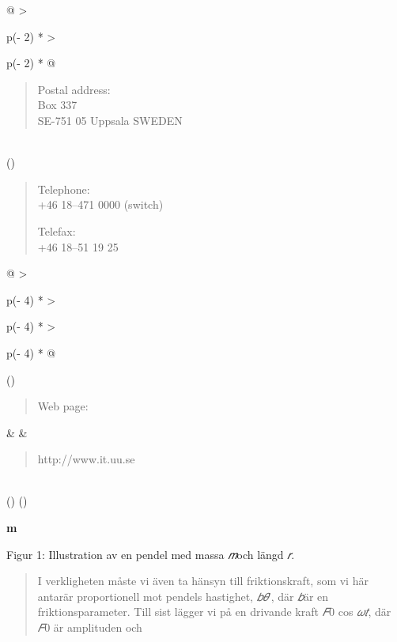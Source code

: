 \documentclass[
]{article}
\begin{document}
\begin{longtable}[]{@{}
  >{\raggedright\arraybackslash}p{(\columnwidth - 2\tabcolsep) * }
  >{\raggedright\arraybackslash}p{(\columnwidth - 2\tabcolsep) * }@{}}
\begin{minipage}[t]{\linewidth}
\begin{quote}
Postal address:\\
Box 337\\
SE-751 05 Uppsala SWEDEN
\end{quote}\strut
\end{minipage} \\
\bottomrule()
\end{longtable}

\begin{quote}
Telephone:\\
+46 18--471 0000 (switch)

Telefax:\\
+46 18--51 19 25
\end{quote}

\begin{longtable}[]{@{}
  >{\raggedright\arraybackslash}p{(\columnwidth - 4\tabcolsep) * }
  >{\raggedright\arraybackslash}p{(\columnwidth - 4\tabcolsep) * }
  >{\raggedright\arraybackslash}p{(\columnwidth - 4\tabcolsep) * }@{}}
\toprule()
\begin{minipage}[b]{\linewidth}\raggedright
\begin{quote}
Web page:
\end{quote}
\end{minipage} &
 &
 \\
\begin{minipage}[b]{\linewidth}\raggedright
\begin{quote}
http://www.it.uu.se
\end{quote}
\end{minipage} \\
\midrule()
\endhead
\bottomrule()
\end{longtable}

\textbf{m}

Figur 1: Illustration av en pendel med massa \emph{𝑚}och längd \emph{𝑟}.

\begin{quote}
I verkligheten måste vi även ta hänsyn till friktionskraft, som vi här
antarär proportionell mot pendels hastighet, \emph{𝑏𝜃}′, där \emph{𝑏}är
en friktionsparameter. Till sist lägger vi på en drivande kraft
\emph{𝐹}0 cos \emph{𝜔𝑡}, där \emph{𝐹}0 är amplituden och
\end{quote}
\end{document}
